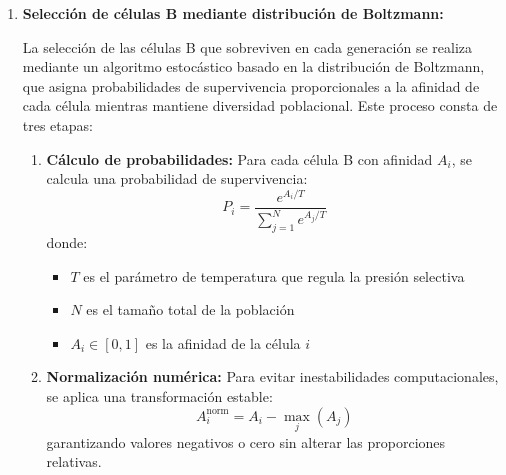 \begin{enumerate}

    \item \textbf{Selección de células B mediante distribución de Boltzmann:}

La selección de las células B que sobreviven en cada generación se realiza mediante un algoritmo estocástico basado en la distribución de Boltzmann, que asigna probabilidades de supervivencia proporcionales a la afinidad de cada célula mientras mantiene diversidad poblacional. Este proceso consta de tres etapas:

\begin{enumerate}
    \item \textbf{Cálculo de probabilidades:} Para cada célula B con afinidad $A_i$, se calcula una probabilidad de supervivencia:
    \[
    P_i = \frac{e^{A_i / T}}{\sum_{j=1}^{N} e^{A_j / T}}
    \]
    donde:
    \begin{itemize}
        \item $T$ es el parámetro de temperatura que regula la presión selectiva
        \item $N$ es el tamaño total de la población
        \item $A_i \in [0,1]$ es la afinidad de la célula $i$
    \end{itemize}
    
    \item \textbf{Normalización numérica:} Para evitar inestabilidades computacionales, se aplica una transformación estable:
    \[
    A_i^{\text{norm}} = A_i - \max_{j}(A_j)
    \]
    garantizando valores negativos o cero sin alterar las proporciones relativas.
    

\end{enumerate}
\end{enumerate}
